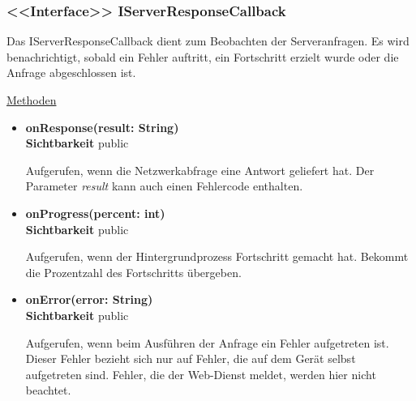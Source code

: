 \subsubsection{<<Interface>> IServerResponseCallback} \label{app:klasse:IServerResponseCallback}
Das IServerResponseCallback dient zum Beobachten der Serveranfragen. Es wird benachrichtigt, sobald ein Fehler auftritt, ein Fortschritt erzielt wurde oder die Anfrage abgeschlossen ist.
\newline

\underline{Methoden}
\begin{itemize}
\itemsep0pt
\item \textbf{onResponse(result: String)}\hfill\\
\textbf{Sichtbarkeit} public

Aufgerufen, wenn die Netzwerkabfrage eine Antwort geliefert hat. Der Parameter \textit{result} kann auch einen Fehlercode enthalten.

\item \textbf{onProgress(percent: int)}\hfill\\
\textbf{Sichtbarkeit} public

Aufgerufen, wenn der Hintergrundprozess Fortschritt gemacht hat. Bekommt die Prozentzahl des Fortschritts übergeben.

\item \textbf{onError(error: String)}\hfill\\
\textbf{Sichtbarkeit} public

Aufgerufen, wenn beim Ausführen der Anfrage ein Fehler aufgetreten ist. Dieser Fehler bezieht sich nur auf Fehler, die auf dem Gerät selbst aufgetreten sind. Fehler, die der Web-Dienst meldet, werden hier nicht beachtet.

\end{itemize}
